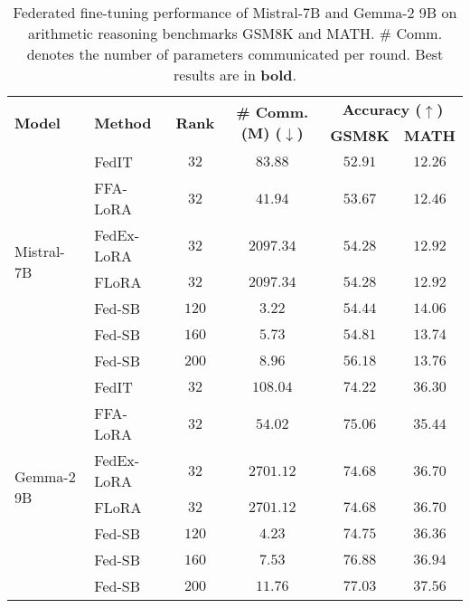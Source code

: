 \begin{table*}[!h]
\centering
\setlength{\tabcolsep}{4.5pt}
\small
\begin{tabular}{llcc|cc}
\toprule
\multirow{2}{*}{\textbf{Model}} & \multirow{2}{*}{\textbf{Method}} & \multirow{2}{*}{\textbf{Rank}} & \multirow{2}{*}{\textbf{\# Comm. (M) ($\downarrow$)}} & \multicolumn{2}{c}{\textbf{Accuracy ($\uparrow$)}} \\
\cmidrule{5-6}
& & & & \textbf{GSM8K} & \textbf{MATH} \\
\midrule
\multirow{7}{*}{Mistral-7B} 
    & FedIT       & $32$  & $83.88$   & $52.91$ & $12.26$ \\
    & FFA-LoRA    & $32$  & $41.94$   & $53.67$ & $12.46$ \\
    & FedEx-LoRA  & $32$  & $2097.34$ & $54.28$ & $12.92$ \\
    & FLoRA       & $32$  & $2097.34$ & $54.28$ & $12.92$ \\
    & \cellcolor{cyan!10}Fed-SB       & \cellcolor{cyan!10}$120$  & \cellcolor{cyan!10}$3.22$    & \cellcolor{cyan!10}$54.44$ & \cellcolor{cyan!10}$\mathbf{14.06}$ \\
    & \cellcolor{cyan!10}Fed-SB       & \cellcolor{cyan!10}$160$  & \cellcolor{cyan!10}$5.73$    & \cellcolor{cyan!10}$54.81$ & \cellcolor{cyan!10}$13.74$ \\
    & \cellcolor{cyan!10}Fed-SB       & \cellcolor{cyan!10}$200$  & \cellcolor{cyan!10}$8.96$    & \cellcolor{cyan!10}$\mathbf{56.18}$ & \cellcolor{cyan!10}$13.76$ \\
\midrule
\multirow{7}{*}{Gemma-2 9B} 
    & FedIT       & $32$  & $108.04$  & $74.22$ & $36.30$ \\
    & FFA-LoRA    & $32$  & $54.02$   & $75.06$ & $35.44$ \\
    & FedEx-LoRA  & $32$  & $2701.12$ & $74.68$ & $36.70$ \\
    & FLoRA       & $32$  & $2701.12$ & $74.68$ & $36.70$ \\
    & \cellcolor{cyan!10}Fed-SB       & \cellcolor{cyan!10}$120$  & \cellcolor{cyan!10}$4.23$    & \cellcolor{cyan!10}$74.75$ & \cellcolor{cyan!10}$36.36$ \\
    & \cellcolor{cyan!10}Fed-SB       & \cellcolor{cyan!10}$160$  & \cellcolor{cyan!10}$7.53$    & \cellcolor{cyan!10}$76.88$ & \cellcolor{cyan!10}$36.94$ \\
    & \cellcolor{cyan!10}Fed-SB       & \cellcolor{cyan!10}$200$  & \cellcolor{cyan!10}$11.76$   & \cellcolor{cyan!10}$\mathbf{77.03}$ & \cellcolor{cyan!10}$\mathbf{37.56}$ \\
\bottomrule
\end{tabular}
\caption{Federated fine-tuning performance of Mistral-7B and Gemma-2 9B on arithmetic reasoning benchmarks GSM8K and MATH. \# Comm. denotes the number of parameters communicated per round. Best results are in \textbf{bold}.
}
\label{tab:arithmetic}
\end{table*}

